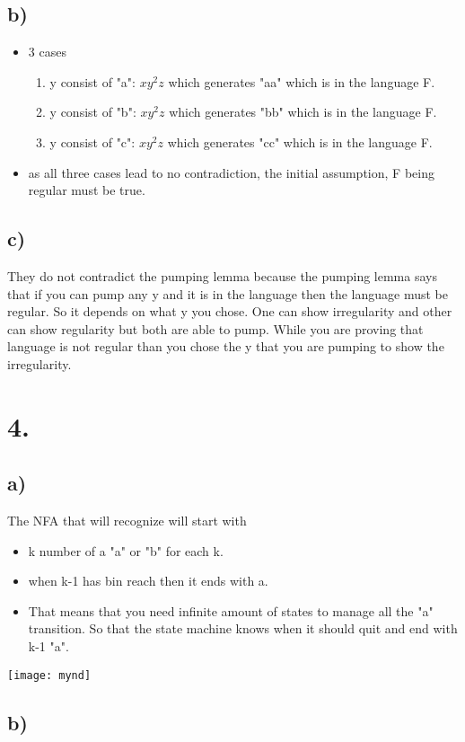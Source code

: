 \documentclass[]{article}
\begin{document}
\subsection*{b)}
\begin{itemize}
\item 3 cases
	\begin{enumerate}
		\item y consist of "a": $xy^{2}z$ which generates "aa" which is in the language F.
		\item y consist of "b": $xy^{2}z$ which generates "bb" which is in the language F.
		\item y consist of "c": $xy^{2}z$ which generates "cc" which is in the language F.
	\end{enumerate}
	\item as all three cases lead to no contradiction, the initial assumption, F being regular must be true.
\end{itemize}

\subsection*{c)}
They do not contradict the pumping lemma because the pumping lemma says that if you can pump any y and it is in the language then the language must be regular. So it depends on what y you chose. One can show irregularity and other can show regularity but both are able to pump. While you are proving that language is not regular than you chose the y that you are pumping to show the irregularity.

\section*{4.}

\subsection*{a)}
The NFA that will recognize will start with
\begin{itemize}
	\item k number of a "a" or "b" for each k.
	\item when k-1 has bin reach then it ends with a.
	\item That means that you need infinite amount of states to manage all the "a" transition. So that the state machine knows when it should quit and end with k-1 "a".
\end{itemize}

\texttt{[image: mynd]}
\subsection*{b)}
\end{document}
